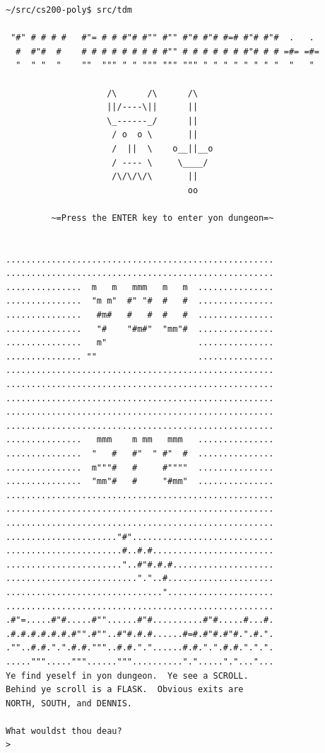 \documentclass[man,12pt]{apa6}
\begin{document}
\begin{singlespace}
\begin{framed}
\begin{verbatim}~/src/cs200-poly$ src/tdm

 "#" # # # #   #"= # # #"# #"" #"" #"# #"# #=# #"# #"#  .   .
  #  #"#  #    # # # # # # # # #"" # # # # # # #"# # # =#= =#=
  "  " "  "    ""  """ " " """ """ """ " " " " " " " "  "   "

                    /\      /\      /\
                    ||/----\||      ||
                    \_------_/      ||
                     / o  o \       ||
                     /  ||  \    o__||__o
                     / ---- \     \____/
                     /\/\/\/\       ||
                                    oo

         ~=Press the ENTER key to enter yon dungeon=~


.....................................................
.....................................................
...............  m   m   mmm   m   m  ...............
...............  "m m"  #" "#  #   #  ...............
...............   #m#   #   #  #   #  ...............
...............   "#    "#m#"  "mm"#  ...............
...............   m"                  ...............
............... ""                    ...............
.....................................................
.....................................................
.....................................................
.....................................................
.....................................................
...............   mmm    m mm   mmm   ...............
...............  "   #   #"  " #"  #  ...............
...............  m"""#   #     #""""  ...............
...............  "mm"#   #     "#mm"  ...............
.....................................................
.....................................................
.....................................................
......................"#"............................
.......................#..#.#........................
......................."..#"#.#.#....................
.........................."."..#.....................
...............................".....................
.....................................................
.#"=.....#"#.....#""......#"#..........#"#.....#...#.
.#.#.#.#.#.#.#"".#""..#"#.#.#......#=#.#"#.#"#.".#.".
.""..#.#.".".#.#."""..#.#."."......#.#.".".#.#.".".".
....."""....."""......""".........."."....."."..."...
Ye find yeself in yon dungeon.  Ye see a SCROLL.
Behind ye scroll is a FLASK.  Obvious exits are
NORTH, SOUTH, and DENNIS.

What wouldst thou deau?
>
\end{verbatim}
\end{framed}
\end{singlespace}
\end{document}
